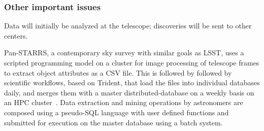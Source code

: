  \subsubsection*{Other important issues}



Data will initially be analyzed at the telescope; discoveries will be sent to other centers.


Pan-STARRS, a contemporary sky survey with similar goals as LSST,  uses a scripted programming model
on a cluster for image processing of telescope frames to extract object attributes as a CSV
file.
This is followed by followed by scientific workflows, based on Trident, that load the files
into individual databases daily, and merges them with a master distributed-database on a weekly basis on an
HPC cluster~\cite{Simmhan:Building:2009}. Data extraction and mining operations by astronomers are composed using a pseudo-SQL
language with user defined functions and submitted for execution on the master database using a batch system.

